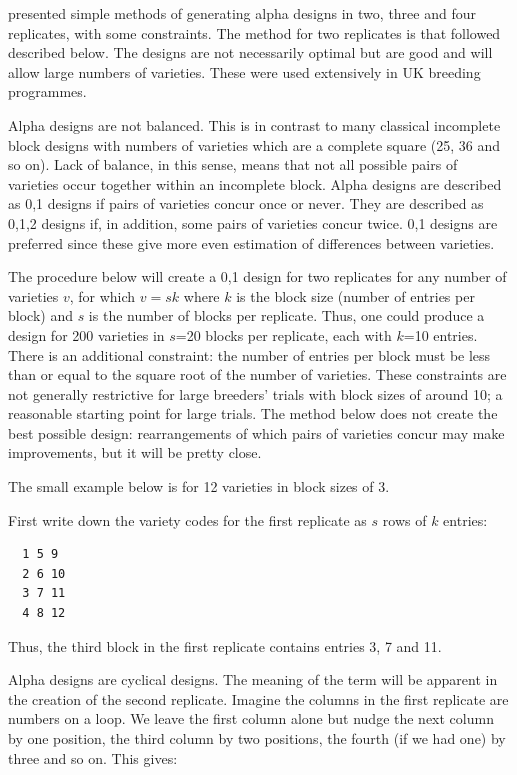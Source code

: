 \documentclass[
]{book}
\begin{document}
\citet{patterson_new_1976} presented simple methods of generating alpha designs in two, three and four replicates, with some constraints. The method for two replicates is that followed described below. The designs are not necessarily optimal but are good and will allow large numbers of varieties. These were used extensively in UK breeding programmes.

Alpha designs are not balanced. This is in contrast to many classical incomplete block designs with numbers of varieties which are a complete square (25, 36 and so on). Lack of balance, in this sense, means that not all possible pairs of varieties occur together within an incomplete block. Alpha designs are described as 0,1 designs if pairs of varieties concur once or never. They are described as 0,1,2 designs if, in addition, some pairs of varieties concur twice. 0,1 designs are preferred since these give more even estimation of differences between varieties.

The procedure below will create a 0,1 design for two replicates for any number of varieties \(v\), for which \(v = sk\) where \(k\) is the block size (number of entries per block) and \(s\) is the number of blocks per replicate. Thus, one could produce a design for 200 varieties in \(s\)=20 blocks per replicate, each with \(k\)=10 entries. There is an additional constraint: the number of entries per block must be less than or equal to the square root of the number of varieties. These constraints are not generally restrictive for large breeders' trials with block sizes of around 10; a reasonable starting point for large trials. The method below does not create the best possible design: rearrangements of which pairs of varieties concur may make improvements, but it will be pretty close.

The small example below is for 12 varieties in block sizes of 3.

First write down the variety codes for the first replicate as \(s\) rows of \(k\) entries:

\begin{verbatim}
  1 5 9
  2 6 10
  3 7 11
  4 8 12
\end{verbatim}

Thus, the third block in the first replicate contains entries 3, 7 and 11.

Alpha designs are cyclical designs. The meaning of the term will be apparent in the creation of the second replicate. Imagine the columns in the first replicate are numbers on a loop. We leave the first column alone but nudge the next column by one position, the third column by two positions, the fourth (if we had one) by three and so on. This gives:
\end{document}
